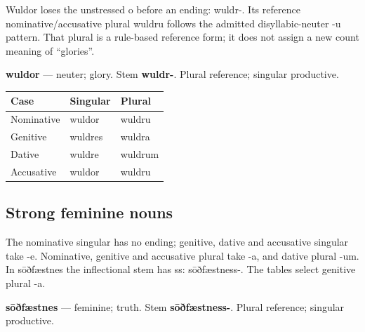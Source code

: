 Wuldor loses the unstressed o before an ending: wuldr-. Its reference nominative/\allowbreak{}accusative plural wuldru follows the admitted disyllabic-neuter -u pattern. That plural is a rule-based reference form; it does not assign a new count meaning of “glories”.

\textbf{wuldor} — neuter; glory. Stem \textbf{wuldr-}. Plural reference; singular productive.

\par\begingroup
\fontsize{10.5}{13.2}\selectfont
\setlength{\LTleft}{0pt}\setlength{\LTright}{\fill}
\noindent
\begin{tabular}{@{}>{\raggedright\arraybackslash}p{39.46mm}>{\raggedright\arraybackslash}p{39.46mm}>{\raggedright\arraybackslash}p{39.46mm}@{}}
\toprule
\textbf{Case} & \textbf{Singular} & \textbf{Plural} \\
\midrule
Nominative & wuldor & wuldru \\
Genitive & wuldres & wuldra \\
Dative & wuldre & wuldrum \\
Accusative & wuldor & wuldru \\
\bottomrule
\end{tabular}
\par\endgroup

\subsection*{Strong feminine nouns}

The nominative singular has no ending; genitive, dative and accusative singular take -e. Nominative, genitive and accusative plural take -a, and dative plural -um. In sōðfæstnes the inflectional stem has ss: sōðfæstness-. The tables select genitive plural -a.

\textbf{sōðfæstnes} — feminine; truth. Stem \textbf{sōðfæstness-}. Plural reference; singular productive.

